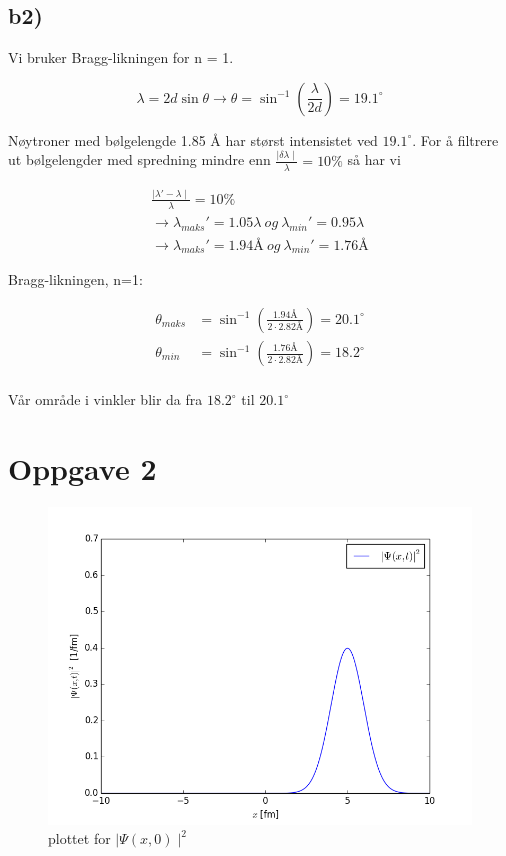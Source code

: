 \documentclass[norsk,a4paper,12pt]{article}
\begin{document}
\subsection*{b2)}

Vi bruker Bragg-likningen for n = 1.

\begin{equation}
\lambda = 2d \sin\theta \rightarrow \theta = \sin^{-1}(\frac{\lambda}{2d}) = 19.1^\circ
\end{equation}


Nøytroner med bølgelengde 1.85 Å har størst intensistet  ved $19.1^\circ$. For å filtrere ut bølgelengder med spredning mindre enn $\frac{\mid \delta\lambda \mid}{\lambda} = 10\%$ så har vi 

\begin{align*}
\frac{\mid \lambda'  - \lambda \mid}{\lambda} = 10\% \\ 
\rightarrow \lambda_{maks}' = 1.05 \lambda \ og \  \lambda_{min}' = 0.95 \lambda\\
\rightarrow \lambda_{maks}' = 1.94 Å  \  og \  \lambda_{min}' = 1.76 Å
\end{align*}

Bragg-likningen, n=1:

\begin{align*}
 \theta_{maks} &= \sin^{-1}(\frac{1.94Å}{2\cdot2.82Å}) = 20.1^\circ \\
 \theta_{min} &= \sin^{-1}(\frac{1.76Å}{2\cdot2.82Å}) = 18.2^\circ\\
\end{align*}


Vår område i vinkler blir da fra $18.2^\circ$ til $ 20.1^\circ$



\section*{Oppgave 2}





\begin{figure}
\includegraphics[scale=0.7]{2a.png}
\caption{plottet for $\mid \Psi(x,0)\mid^2$}
\label{fig:2a}
\end{figure}
\end{document}

